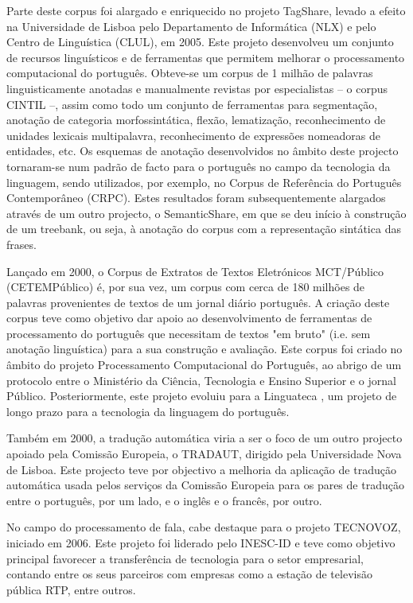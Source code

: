 \begin{multicols}{2}
Parte deste corpus foi alargado e enriquecido no projeto TagShare, levado a efeito na Universidade de Lisboa 
pelo Departamento de Informática (NLX) e pelo Centro de Linguística (CLUL), em 2005. 
Este projeto desenvolveu um conjunto de recursos linguísticos e de ferramentas que permitem melhorar o processamento computacional do português. 
Obteve-se um corpus de 1 milhão de palavras linguisticamente anotadas e manualmente revistas por especialistas -- o corpus CINTIL \cite{cintil} --, assim como todo um conjunto de ferramentas para segmentação, anotação de categoria morfossintática, flexão, lematização, reconhecimento de unidades lexicais multipalavra, reconhecimento de expressões nomeadoras de entidades, etc. 
Os esquemas de anotação desenvolvidos no âmbito deste projecto tornaram-se
num padrão de facto para o português no campo da tecnologia da linguagem, 
sendo utilizados, por exemplo, no Corpus de Referência do Português Contemporâneo (CRPC).
Estes resultados foram subsequentemente alargados através de um outro projecto, o SemanticShare, em
que se deu início à construção de um treebank, ou seja, à anotação do corpus com a representação
sintática das frases.

Lançado em 2000, o Corpus de Extratos de Textos Eletrónicos MCT/Público (CETEMPúblico) é, por sua vez, 
um corpus com cerca de 180 milhões de palavras provenientes de textos de um jornal diário português. 
A criação deste corpus teve como objetivo dar apoio ao desenvolvimento de ferramentas de processamento 
do português que necessitam de textos "em bruto" (i.e. sem anotação linguística) para a sua construção e avaliação. 
Este corpus foi criado no âmbito do projeto Processamento Computacional do Português, 
ao abrigo de um protocolo entre o Ministério da Ciência, Tecnologia e Ensino Superior e o jornal Público. 
Posteriormente, este projeto evoluiu para a Linguateca \cite{linguateca}, um projeto de longo prazo para a tecnologia 
da linguagem do português.

Também em 2000, a tradução automática viria a ser o foco de um outro projecto apoiado pela
Comissão Europeia, o TRADAUT, dirigido pela Universidade Nova de Lisboa. Este projecto teve por
objectivo a melhoria da aplicação de tradução automática usada pelos serviços da
Comissão Europeia para os pares de tradução entre o português, por um lado,  e o inglês e o francês, por outro.

No campo do processamento de fala, cabe destaque para o projeto TECNOVOZ, iniciado em 2006. 
Este projeto foi liderado pelo INESC-ID e teve como objetivo principal favorecer a transferência
de tecnologia para o setor empresarial, contando entre os seus parceiros com empresas como a estação
de televisão pública RTP, entre outros.


\end{multicols}
